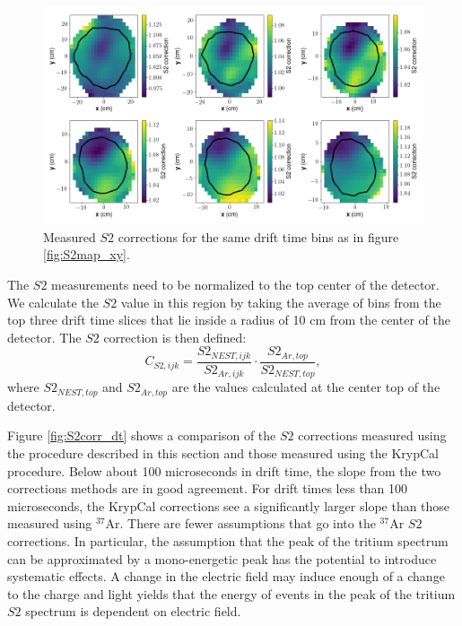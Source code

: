 {\begin{figure}[h!]
\centering
\includegraphics[width=150mm]{Figures/S2corr_xy.png}
\caption{Measured $S2$ corrections for the same drift time bins as in figure \ref{fig:S2map_xy}. }
\label{fig:S2corr_xy} 
\end{figure}
The $S2$ measurements need to be normalized to the top center of the detector. We calculate the $S2$ value in this region by taking the average of bins from the top three drift time slices that lie inside a radius of 10 cm from the center of the detector. The $S2$ correction is then defined:
\begin{equation}
C_{S2,ijk}=\frac{S2_{NEST,ijk}}{S2_{Ar,ijk}}\cdot \frac{S2_{Ar,top}}{S2_{NEST,top}},
\end{equation}
where $S2_{NEST,top}$ and $S2_{Ar,top}$ are the values calculated at the center top of the detector.

Figure \ref{fig:S2corr_dt} shows a comparison of the $S2$ corrections measured using the procedure described in this section and those measured using the KrypCal procedure. Below about 100 microseconds in drift time, the slope from the two corrections methods are in good agreement. For drift times less than 100 microseconds, the KrypCal corrections see a significantly larger slope than those measured using $^{37}$Ar. There are fewer assumptions that go into the $^{37}$Ar $S2$ corrections. In particular, the assumption that the peak of the tritium spectrum can be approximated by a mono-energetic peak has the potential to introduce systematic effects. A change in the electric field may induce enough of a change to the charge and light yields that the energy of events in the peak of the tritium $S2$ spectrum is dependent on electric field. 

}
